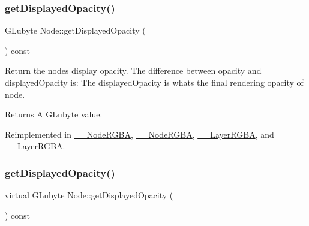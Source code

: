 \mbox{\label{classNode_ac4f9c61560c8862ebdaecbf79bf8a1b6}} 
\subsubsection{\texorpdfstring{get\+Displayed\+Opacity()}{getDisplayedOpacity()}\hspace{0.1cm}{\footnotesize\ttfamily [1/2]}}
{\footnotesize\ttfamily G\+Lubyte Node\+::get\+Displayed\+Opacity (\begin{DoxyParamCaption}{ }\end{DoxyParamCaption}) const\hspace{0.3cm}{\ttfamily [virtual]}}

Return the node\textquotesingle{}s display opacity. The difference between opacity and displayed\+Opacity is\+: The displayed\+Opacity is what\textquotesingle{}s the final rendering opacity of node. \begin{DoxyReturn}{Returns}
A G\+Lubyte value. 
\end{DoxyReturn}


Reimplemented in \hyperlink{class____NodeRGBA_adbf1aa17734836db2096f2901d81d304}{\+\_\+\+\_\+\+Node\+R\+G\+BA}, \hyperlink{class____NodeRGBA_adbf1aa17734836db2096f2901d81d304}{\+\_\+\+\_\+\+Node\+R\+G\+BA}, \hyperlink{class____LayerRGBA_a3c94f57397e6c53127d1176d14ab25fe}{\+\_\+\+\_\+\+Layer\+R\+G\+BA}, and \hyperlink{class____LayerRGBA_a3c94f57397e6c53127d1176d14ab25fe}{\+\_\+\+\_\+\+Layer\+R\+G\+BA}.

\mbox{\label{classNode_a81bba31d0e8774ac3fe5c517bfe86e97}} 
\subsubsection{\texorpdfstring{get\+Displayed\+Opacity()}{getDisplayedOpacity()}\hspace{0.1cm}{\footnotesize\ttfamily [2/2]}}
{\footnotesize\ttfamily virtual G\+Lubyte Node\+::get\+Displayed\+Opacity (\begin{DoxyParamCaption}{ }\end{DoxyParamCaption}) const\hspace{0.3cm}{\ttfamily [virtual]}}

